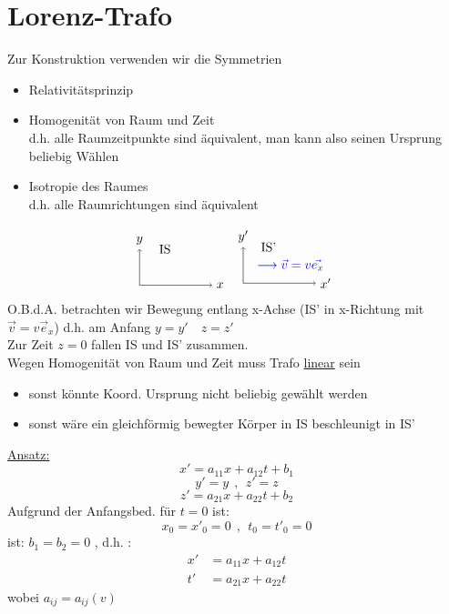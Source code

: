 \documentclass[titlepage,12pt,a4paper,ngerman]{report}
\begin{document}
{\section{Lorenz-Trafo}
Zur Konstruktion verwenden wir die Symmetrien
\begin{itemize}
	\item Relativitätsprinzip
	\item Homogenität von Raum und Zeit\\
	d.h. alle Raumzeitpunkte sind äquivalent, man kann also seinen Ursprung beliebig Wählen
	\item Isotropie des Raumes\\
	d.h. alle Raumrichtungen sind äquivalent
\end{itemize}
$$
\begin{tikzpicture}
\draw[->] (0,0) -- (2,0) node[right] {$x$}; 
\draw[->] (0,0) -- (0,1) node[above] {$y$};
\node at (0.7,1) [align=flush center,text width=2cm]
{IS};
\end{tikzpicture}%
\begin{tikzpicture}
\draw[->] (0,0) -- (2,0) node[right] {$x'$}; 
\draw[->] (0,0) -- (0,1) node[above] {$y'$};
\node at (1.3,0.5) [align=flush center,text width=3cm]
{\color{blue}$\longrightarrow \vec{v} = v\vec{e_x}$};
\node at (0.7,1) [align=flush center,text width=2cm]
{IS'};
\end{tikzpicture}
$$
O.B.d.A. betrachten wir Bewegung entlang x-Achse (IS' in x-Richtung mit $ \vec{v} = v \vec{e}_x $) d.h. am Anfang $ y = y' \quad z = z' $\\
Zur Zeit $ z=0 $ fallen IS und IS' zusammen.\\[5pt]
Wegen Homogenität von Raum und Zeit muss Trafo \underline{linear} sein
\begin{itemize}
	\item sonst könnte Koord. Ursprung nicht beliebig gewählt werden
	\item sonst wäre ein gleichförmig bewegter Körper in IS beschleunigt in IS' 
\end{itemize}
\underline{Ansatz:} 
$$x' = a_{11} x + a_{12} t + b_1$$
$$y' = y \ \ , \ \ z' = z$$
$$z' = a_{21} x + a_{22} t + b_2$$
Aufgrund der Anfangsbed. für $ t=0 $ ist:
$$x_0 = x'_0 = 0 \ \ , \ \ t_0 = t'_0 = 0$$
ist: $b_1 = b_2 = 0$ , d.h. :
\begin{align}
x' &= a_{11} x + a_{12} t \tag{1}\\
t' &= a_{21} x + a_{22} t \tag{2}
\end{align}
wobei $ a_{ij} = a_{ij}(v) $\\[5pt]
}
\end{document}
